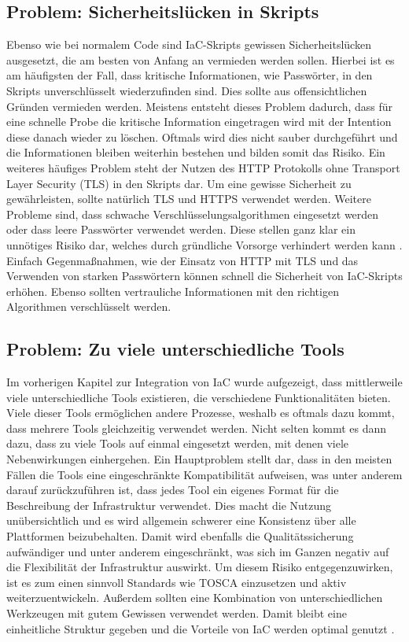 \documentclass[biblatex]{lni}
\begin{document}
\subsection{Problem: Sicherheitslücken in Skripts}
Ebenso wie bei normalem Code sind IaC-Skripts gewissen Sicherheitslücken ausgesetzt, die am besten von Anfang an vermieden werden sollen. Hierbei ist es am häufigsten der Fall, dass kritische Informationen, wie Passwörter, in den Skripts unverschlüsselt wiederzufinden sind. Dies sollte aus offensichtlichen Gründen vermieden werden. Meistens entsteht dieses Problem dadurch, dass für eine schnelle Probe die kritische Information eingetragen wird mit der Intention diese danach wieder zu löschen. Oftmals wird dies nicht sauber durchgeführt und die Informationen bleiben weiterhin bestehen und bilden somit das Risiko. Ein weiteres häufiges Problem steht der Nutzen des HTTP Protokolls ohne Transport Layer Security (TLS) in den Skripts dar. Um eine gewisse Sicherheit zu gewährleisten, sollte natürlich TLS und HTTPS verwendet werden. Weitere Probleme sind, dass schwache Verschlüsselungsalgorithmen eingesetzt werden oder dass leere Passwörter verwendet werden. Diese stellen ganz klar ein unnötiges Risiko dar, welches durch gründliche Vorsorge verhindert werden kann \cite[S. 165-172]{Rahman.}.\\
Einfach Gegenmaßnahmen, wie der Einsatz von HTTP mit TLS und das Verwenden von starken Passwörtern können schnell die Sicherheit von IaC-Skripts erhöhen. Ebenso sollten vertrauliche Informationen mit den richtigen Algorithmen verschlüsselt werden. 

\subsection{Problem: Zu viele unterschiedliche Tools}
Im vorherigen Kapitel zur Integration von IaC wurde aufgezeigt, dass mittlerweile viele unterschiedliche Tools existieren, die verschiedene Funktionalitäten bieten. Viele dieser Tools ermöglichen andere Prozesse, weshalb es oftmals dazu kommt, dass mehrere Tools gleichzeitig verwendet werden. Nicht selten kommt es dann dazu, dass zu viele Tools auf einmal eingesetzt werden, mit denen viele Nebenwirkungen einhergehen. Ein Hauptproblem stellt dar, dass in den meisten Fällen die Tools eine eingeschränkte Kompatibilität aufweisen, was unter anderem darauf zurückzuführen ist, dass jedes Tool ein eigenes Format für die Beschreibung der Infrastruktur verwendet. Dies macht die Nutzung unübersichtlich und es wird allgemein schwerer eine Konsistenz über alle Plattformen beizubehalten. Damit wird ebenfalls die Qualitätssicherung aufwändiger und unter anderem eingeschränkt, was sich im Ganzen negativ auf die Flexibilität der Infrastruktur auswirkt. Um diesem Risiko entgegenzuwirken, ist es zum einen sinnvoll Standards wie TOSCA einzusetzen und aktiv weiterzuentwickeln. Außerdem sollten eine Kombination von unterschiedlichen Werkzeugen mit gutem Gewissen verwendet werden. Damit bleibt eine einheitliche Struktur gegeben und die Vorteile von IaC werden optimal genutzt \cite[S. 580-587]{Guerriero.2019}.
\end{document}
